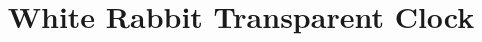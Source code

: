 \documentclass[conference]{IEEEtran}
\begin{document}
\title{White Rabbit Transparent Clock}


\maketitle













%


\balance

\end{document}
